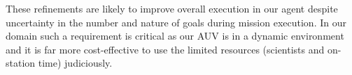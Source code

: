 
These refinements are likely to improve overall execution in our agent
despite uncertainty in the number and nature of goals during mission
execution. 
In our domain such a requirement is critical as our AUV is in a
dynamic environment and it is far more cost-effective to use the
limited resources (scientists and on-station time) judiciously.  





